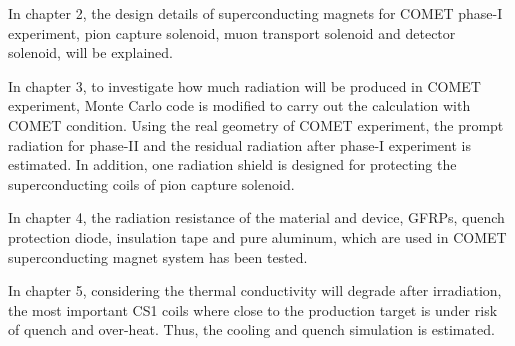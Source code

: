 In chapter 2, the design details of superconducting magnets for COMET phase-I experiment, pion capture solenoid, muon transport solenoid and detector solenoid, will be explained.

In chapter 3, to investigate how much radiation will be produced in COMET experiment, Monte Carlo code is modified to carry out the calculation with COMET condition.
Using the real geometry of COMET experiment, the prompt radiation for phase-II and the residual radiation after phase-I experiment is estimated.
In addition, one radiation shield is designed for protecting the superconducting coils of pion capture solenoid.

In chapter 4, the radiation resistance of the material and device, GFRPs, quench protection diode, insulation tape and pure aluminum, which are used in COMET superconducting magnet system has been tested.

In chapter 5, considering the thermal conductivity will degrade after irradiation, the most important CS1 coils where close to the production target is under risk of quench and over-heat.
Thus, the cooling and quench simulation is estimated.



